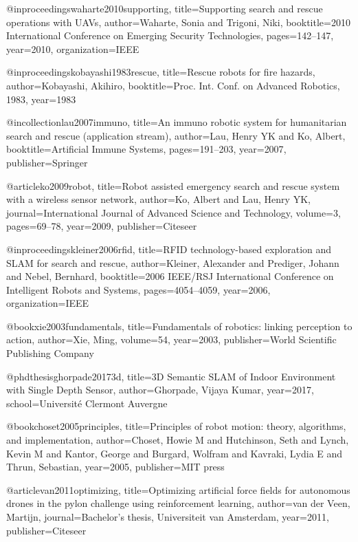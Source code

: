 @inproceedings{waharte2010supporting,
  title={Supporting search and rescue operations with UAVs},
  author={Waharte, Sonia and Trigoni, Niki},
  booktitle={2010 International Conference on Emerging Security Technologies},
  pages={142--147},
  year={2010},
  organization={IEEE}
}

@inproceedings{kobayashi1983rescue,
  title={Rescue robots for fire hazards},
  author={Kobayashi, Akihiro},
  booktitle={Proc. Int. Conf. on Advanced Robotics, 1983},
  year={1983}
}

@incollection{lau2007immuno,
  title={An immuno robotic system for humanitarian search and rescue (application stream)},
  author={Lau, Henry YK and Ko, Albert},
  booktitle={Artificial Immune Systems},
  pages={191--203},
  year={2007},
  publisher={Springer}
}

@article{ko2009robot,
  title={Robot assisted emergency search and rescue system with a wireless sensor network},
  author={Ko, Albert and Lau, Henry YK},
  journal={International Journal of Advanced Science and Technology},
  volume={3},
  pages={69--78},
  year={2009},
  publisher={Citeseer}
}

@inproceedings{kleiner2006rfid,
  title={RFID technology-based exploration and SLAM for search and rescue},
  author={Kleiner, Alexander and Prediger, Johann and Nebel, Bernhard},
  booktitle={2006 IEEE/RSJ International Conference on Intelligent Robots and Systems},
  pages={4054--4059},
  year={2006},
  organization={IEEE}
}

@book{xie2003fundamentals,
  title={Fundamentals of robotics: linking perception to action},
  author={Xie, Ming},
  volume={54},
  year={2003},
  publisher={World Scientific Publishing Company}
}

@phdthesis{ghorpade20173d,
  title={3D Semantic SLAM of Indoor Environment with Single Depth Sensor},
  author={Ghorpade, Vijaya Kumar},
  year={2017},
  school={Universit{\'e} Clermont Auvergne}
}

@book{choset2005principles,
  title={Principles of robot motion: theory, algorithms, and implementation},
  author={Choset, Howie M and Hutchinson, Seth and Lynch, Kevin M and Kantor, George and Burgard, Wolfram and Kavraki, Lydia E and Thrun, Sebastian},
  year={2005},
  publisher={MIT press}
}

@article{van2011optimizing,
  title={Optimizing artificial force fields for autonomous drones in the pylon challenge using reinforcement learning},
  author={van der Veen, Martijn},
  journal={Bachelor's thesis, Universiteit van Amsterdam},
  year={2011},
  publisher={Citeseer}
}

